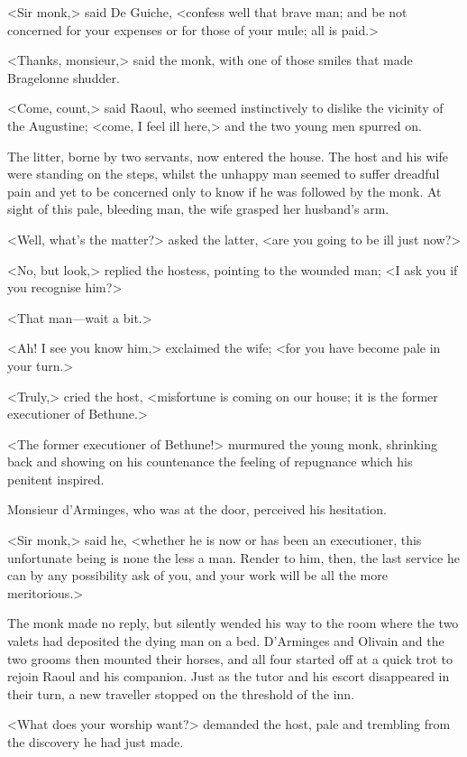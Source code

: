 <Sir monk,> said De Guiche, <confess well that brave man; and be not concerned for your expenses or for those of your mule; all is paid.>

<Thanks, monsieur,> said the monk, with one of those smiles that made Bragelonne shudder.

<Come, count,> said Raoul, who seemed instinctively to dislike the vicinity of the Augustine; <come, I feel ill here,> and the two young men spurred on.

The litter, borne by two servants, now entered the house. The host and his wife were standing on the steps, whilst the unhappy man seemed to suffer dreadful pain and yet to be concerned only to know if he was followed by the monk. At sight of this pale, bleeding man, the wife grasped her husband's arm.

<Well, what's the matter?> asked the latter, <are you going to be ill just now?>

<No, but look,> replied the hostess, pointing to the wounded man; <I ask you if you recognise him?>

<That man—wait a bit.>

<Ah! I see you know him,> exclaimed the wife; <for you have become pale in your turn.>

<Truly,> cried the host, <misfortune is coming on our house; it is the former executioner of Bethune.>

<The former executioner of Bethune!> murmured the young monk, shrinking back and showing on his countenance the feeling of repugnance which his penitent inspired.

Monsieur d'Arminges, who was at the door, perceived his hesitation.

<Sir monk,> said he, <whether he is now or has been an executioner, this unfortunate being is none the less a man. Render to him, then, the last service he can by any possibility ask of you, and your work will be all the more meritorious.>

The monk made no reply, but silently wended his way to the room where the two valets had deposited the dying man on a bed. D'Arminges and Olivain and the two grooms then mounted their horses, and all four started off at a quick trot to rejoin Raoul and his companion. Just as the tutor and his escort disappeared in their turn, a new traveller stopped on the threshold of the inn.

<What does your worship want?> demanded the host, pale and trembling from the discovery he had just made.

